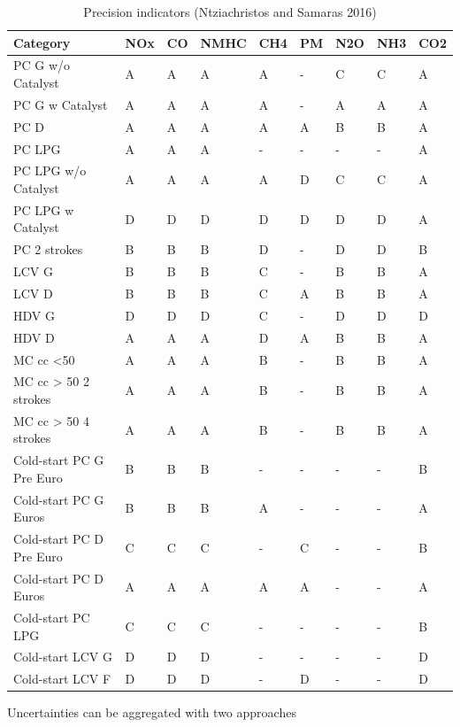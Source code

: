\documentclass[12pt,graybox,envcountchap,sectrefs]{krantz}
\theoremstyle{definition}
\theoremstyle{definition}
\theoremstyle{definition}
\theoremstyle{remark}
\begin{document}
\begin{table}

\caption{\label{tab:precision}Precision indicators (Ntziachristos and Samaras 2016)}
\centering
\begin{tabular}[t]{l|l|l|l|l|l|l|l|l}
\hline
Category & NOx & CO & NMHC & CH4 & PM & N2O & NH3 & CO2\\
\hline
PC G w/o Catalyst & A & A & A & A & - & C & C & A\\
\hline
PC G w Catalyst & A & A & A & A & - & A & A & A\\
\hline
PC D & A & A & A & A & A & B & B & A\\
\hline
PC LPG & A & A & A & - & - & - & - & A\\
\hline
PC LPG w/o Catalyst & A & A & A & A & D & C & C & A\\
\hline
PC LPG w Catalyst & D & D & D & D & D & D & D & A\\
\hline
PC 2 strokes & B & B & B & D & - & D & D & B\\
\hline
LCV G & B & B & B & C & - & B & B & A\\
\hline
LCV D & B & B & B & C & A & B & B & A\\
\hline
HDV G & D & D & D & C & - & D & D & D\\
\hline
HDV D & A & A & A & D & A & B & B & A\\
\hline
MC cc <50 & A & A & A & B & - & B & B & A\\
\hline
MC cc > 50 2 strokes & A & A & A & B & - & B & B & A\\
\hline
MC cc > 50 4 strokes & A & A & A & B & - & B & B & A\\
\hline
Cold-start PC G Pre Euro & B & B & B & - & - & - & - & B\\
\hline
Cold-start PC G Euros & B & B & B & A & - & - & - & A\\
\hline
Cold-start PC D Pre Euro & C & C & C & - & C & - & - & B\\
\hline
Cold-start PC D Euros & A & A & A & A & A & - & - & A\\
\hline
Cold-start PC LPG & C & C & C & - & - & - & - & B\\
\hline
Cold-start LCV G & D & D & D & - & - & - & - & D\\
\hline
Cold-start LCV F & D & D & D & - & D & - & - & D\\
\hline
\end{tabular}
\end{table}

Uncertainties can be aggregated with two approaches
\end{document}
